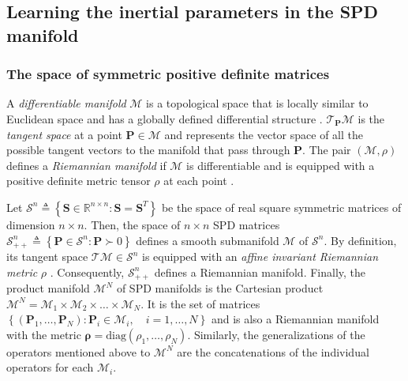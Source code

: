 \subsection{Learning the inertial parameters in the SPD manifold}\label{sec:rb_ip_on_spd}

\subsubsection{The space of symmetric positive definite matrices}\label{sec:spd_manifold}
A \emph{differentiable manifold} $\mathcal{M}$ is a topological space that is locally similar to Euclidean space and has a globally defined differential structure \cite{Jayasumana2013KernelmethodsRiemannian}. $\mathcal{T}_{\bm{P}}\mathcal{M}$ is the \emph{tangent space} at a point $\bm{P}\in \mathcal{M}$ and represents the vector space of all the possible tangent vectors to the manifold that pass through $\bm{P}$. The pair $(\mathcal{M},\rho)$ defines a \emph{Riemannian manifold} if $ \mathcal{M} $ is differentiable and is equipped with a positive definite metric tensor $\rho$ at each point \cite{Pennec2006Riemannianframeworktensor}. 

Let $\mathcal{S}^n \triangleq\left\lbrace \bm{S} \in \mathbb{R}^{n \times n} : \bm{S} = \bm{S}^T\right\rbrace$ be the space of real square symmetric matrices of dimension $n \times n$. Then, the space of $n \times n$ SPD matrices $ \mathcal{S}^n_{++}\triangleq \left\lbrace \bm{P}\in \mathcal{S}^n : \bm{P} \succ 0 \right\rbrace $  defines a smooth submanifold $\mathcal{M}$ of $\mathcal{S}^n$. By definition, its tangent space $\mathcal{T}\mathcal{M} \in \mathcal{S}^n$ is equipped with an \emph{affine invariant Riemannian metric} $\rho$ \cite{Lee2018geometricalgorithmrobust}. Consequently, $ \mathcal{S}^n_{++} $ defines a Riemannian manifold. Finally, the product manifold $ \mathcal{M}^N $ of SPD manifolds is the Cartesian product $\mathcal{M}^N =\mathcal{M}_1\times \mathcal{M}_2\times \ldots \times \mathcal{M}_N$. It is the set of matrices  $\left\lbrace \left(\bm{P}_1,\ldots,\bm{P}_N\right):\bm{P}_i\in\mathcal{M}_i,\quad i=1,\ldots,N\right\rbrace$ and is also a Riemannian manifold with the metric $ \bm{\rho} =\text{diag}\left( \rho_{1},\ldots, \rho_{N} \right) $. Similarly, the generalizations of the operators mentioned above to $\mathcal{M}^N$ are the concatenations of the individual operators for each $\mathcal{M}_i$.

